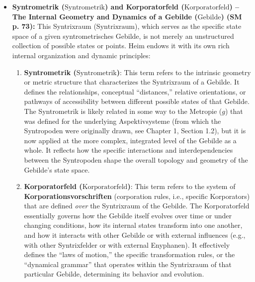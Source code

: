 \documentclass[12pt]{article}
\newcommand{\q}[1]{\enquote{#1}}
\newcommand{\syntrometrischesGebilde}{\text{Gebilde}}
\newcommand{\syntrixraum}{\text{Syntrixraum}}
\newcommand{\syntrometrik}{\text{Syntrometrik}}
\newcommand{\korporatorfeld}{\text{Korporatorfeld}}
\begin{document}
\begin{itemize}
    \item \textbf{Syntrometrik (\(\syntrometrik\)) and Korporatorfeld (\(\korporatorfeld\)) – The Internal Geometry and Dynamics of a Gebilde (\(\syntrometrischesGebilde\)) (SM p. 73):}
    This Syntrixraum (\(\syntrixraum\)), which serves as the specific state space of a given syntrometrisches Gebilde, is not merely an unstructured collection of possible states or points. Heim endows it with its own rich internal organization and dynamic principles:
    \begin{enumerate}
        \item \textbf{Syntrometrik (\(\syntrometrik\))}: This term refers to the intrinsic geometry or metric structure that characterizes the Syntrixraum of a Gebilde. It defines the relationships, conceptual \q{distances,} relative orientations, or pathways of accessibility between different possible states of that Gebilde. The Syntrometrik is likely related in some way to the Metropie (\(g\)) that was defined for the underlying Aspektivsysteme (from which the Syntropoden were originally drawn, see Chapter 1, Section 1.2), but it is now applied at the more complex, integrated level of the Gebilde as a whole. It reflects how the specific interactions and interdependencies between the Syntropoden shape the overall topology and geometry of the Gebilde's state space.
        \item \textbf{Korporatorfeld (\(\korporatorfeld\))}: This term refers to the system of \textbf{Korporationsvorschriften} (corporation rules, i.e., specific Korporators) that are defined \textit{over} the Syntrixraum of the Gebilde. The Korporatorfeld essentially governs how the Gebilde itself evolves over time or under changing conditions, how its internal states transform into one another, and how it interacts with other Gebilde or with external influences (e.g., with other Syntrixfelder or with external Enyphanen). It effectively defines the \q{laws of motion,} the specific transformation rules, or the \q{dynamical grammar} that operates within the Syntrixraum of that particular Gebilde, determining its behavior and evolution.
    \end{enumerate}


\end{itemize}
\end{document}

